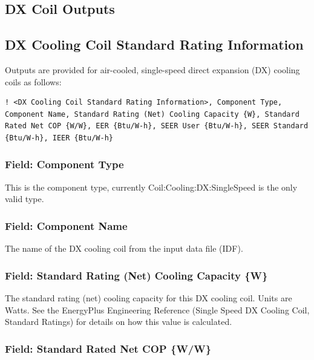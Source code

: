 \subsection{DX Coil Outputs}\label{dx-coil-outputs}

\subsection{DX Cooling Coil Standard Rating Information}\label{dx-cooling-coil-standard-ratings-2010}

Outputs are provided for air-cooled, single-speed direct expansion (DX) cooling coils as follows:

\begin{lstlisting}
! <DX Cooling Coil Standard Rating Information>, Component Type, Component Name, Standard Rating (Net) Cooling Capacity {W}, Standard Rated Net COP {W/W}, EER {Btu/W-h}, SEER User {Btu/W-h}, SEER Standard {Btu/W-h}, IEER {Btu/W-h}
\end{lstlisting}

\subsubsection{Field: Component Type}\label{field-component-type-3}

This is the component type, currently Coil:Cooling:DX:SingleSpeed is the only valid type.

\subsubsection{Field: Component Name}\label{field-component-name-3}

The name of the DX cooling coil from the input data file (IDF).

\subsubsection{Field: Standard Rating (Net) Cooling Capacity \{W\}}

The standard rating (net) cooling capacity for this DX cooling coil. Units are Watts. See the EnergyPlus Engineering Reference (Single Speed DX Cooling Coil, Standard Ratings) for details on how this value is calculated.

\subsubsection{Field: Standard Rated Net COP \{W/W\}}

